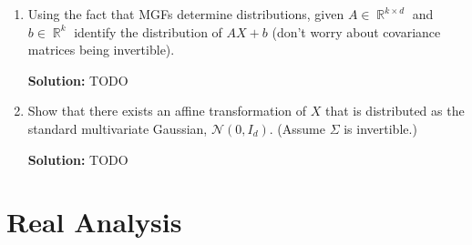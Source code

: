 \documentclass{article}
\newcommand{\Question}[1]{\Large \section{ #1 } \normalsize}
\DeclareMathOperator{\R}{\mathbb{R}}
\newenvironment{solution}{\color{blue} \smallskip \textbf{Solution:}}{}
\begin{document}
\begin{enumerate}
    \begin{solution}
        TODO
    \end{solution}

    \item 
    Using the fact that MGFs determine distributions, given $A \in \R^{k \times d}$ and $b \in \R^k$ identify the distribution of $AX + b$ (don't worry about covariance matrices being invertible). 

    \begin{solution}
        TODO
    \end{solution}

    \item
    Show that there exists an affine transformation of $X$ that is distributed as the standard multivariate Gaussian, $\mathcal{N}(0, I_d)$. (Assume $\Sigma$ is invertible.) 

    \begin{solution}
        TODO
    \end{solution}

\end{enumerate}

\newpage
\Question{Real Analysis}
\end{document}
